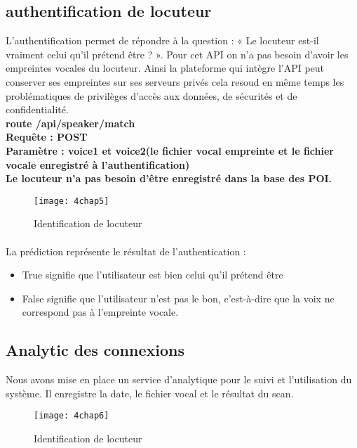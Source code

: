 \subsection{authentification de locuteur}
L’authentification permet de répondre à la question : « Le locuteur est-il vraiment celui qu’il prétend être ? ». Pour cet API on n’a pas besoin d’avoir les empreintes vocales du locuteur. Ainsi la plateforme qui intègre l’API peut conserver ses empreintes sur ses serveurs privés cela resoud en même temps les problématiques de privilèges d’accès aux données, de sécurités et de confidentialité.
\\\textbf{route  /api/speaker/match}
\\\textbf{Requête : POST}
\\\textbf{Paramètre : voice1 et voice2(le fichier vocal empreinte et le fichier vocale enregistré à l’authentification)}
\\\textbf{Le locuteur n’a pas besoin d’être enregistré dans la base des POI.}

\begin{figure}[h]
	\centering
	\texttt{[image: 4chap5]}
	\caption{Identification de locuteur}
	\label{fig:4chap5}
\end{figure}

\paragraph{}La prédiction représente le résultat de l’authentication :

\begin{itemize}
    \item True signifie que l’utilisateur est bien celui qu’il prétend être
    \item False signifie que l’utilisateur n’est pas le bon, c’est-à-dire que la voix ne correspond pas à l’empreinte vocale.
\end{itemize}

\subsection{Analytic des connexions}
Nous avons mise en place un service d’analytique pour le suivi et l’utilisation du système. Il enregistre la date, le fichier vocal et le résultat du scan. 


\begin{figure}[h]
	\centering
	\texttt{[image: 4chap6]}
	\caption{Identification de locuteur}
	\label{fig:4chap6}
\end{figure}

